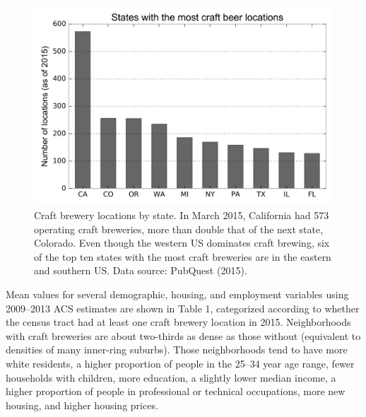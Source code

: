 \documentclass[]{article}
\begin{document}
\begin{figure}
	\centering
		\includegraphics[width=0.95\linewidth]{fig02.png}
	\caption{Craft brewery locations by state. In March 2015, California had 573
operating craft breweries, more than double that of the next state,
Colorado. Even though the western US dominates craft brewing, six of the
top ten states with the most craft breweries are in the eastern and
southern US. Data source: PubQuest (2015).}
	\label{fig:breweries}
\end{figure}

Mean values for several demographic, housing, and employment variables
using 2009--2013 ACS estimates are shown in Table 1, categorized
according to whether the census tract had at least one craft brewery
location in 2015. Neighborhoods with craft breweries are about
two-thirds as dense as those without (equivalent to densities of many
inner-ring suburbs). Those neighborhoods tend to have more white
residents, a higher proportion of people in the 25--34 year age range,
fewer households with children, more education, a slightly lower median
income, a higher proportion of people in professional or technical
occupations, more new housing, and higher housing prices.
\end{document}
